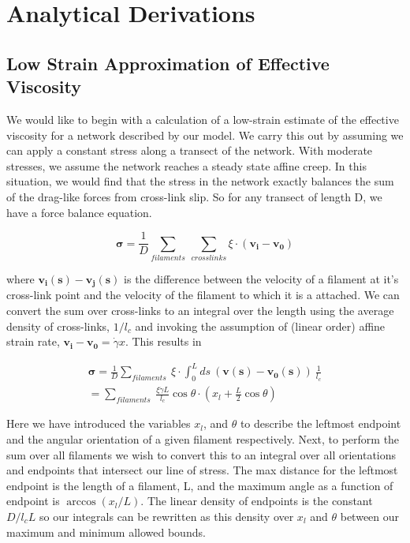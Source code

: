 \documentclass[pre,preprint]{revtex4-1}
\begin{document}
\section{Analytical Derivations}

\subsection{Low Strain Approximation of Effective Viscosity}
We would like to begin with a calculation of a low-strain estimate of the effective viscosity for a network described by our model.  We carry this out by assuming we can apply a constant stress along a transect of the network.  With moderate stresses, we assume the network reaches a steady state affine creep. In this situation, we would find that the stress in the network exactly balances the sum of the drag-like forces from cross-link slip.  So for any transect of length D, we have a force balance equation.

\begin{equation}
\mathbf{\sigma} = \frac{1}{D}\sum_{filaments}\: \sum_{crosslinks}\xi \cdot (\mathbf{v_i}-\mathbf{v_0})
\end{equation}

where $\mathbf{v_i(s)}-\mathbf{v_j(s)}$ is the difference between the velocity of a filament at it's cross-link point and the velocity of the filament to which it is a attached. We can convert the sum over cross-links to an integral over the length using the average density of cross-links, $1/l_c$ and invoking the assumption of (linear order) affine strain rate, $\mathbf{v_i}-\mathbf{v_0}=\dot \gamma x$. This results in

\begin{multline}
\mathbf{\sigma} =  \frac{1}{D}\sum_{filaments}\:  \xi \cdot \int_0^L ds \: (\mathbf{v(s)}-\mathbf{v_0(s)}) \:\frac{1}{l_c} \\
 = \sum_{filaments}\:  \frac{\xi \dot \gamma L}{l_c} \cos \theta \cdot (x_l + \frac{L}{2} \cos \theta)
\end{multline}

Here we have introduced the variables $x_l$, and $\theta$ to describe the leftmost endpoint and the angular orientation of a given filament respectively.  Next, to perform the sum over all filaments we wish to convert this to an integral over all orientations and endpoints that intersect our line of stress. The max distance for the leftmost endpoint is the length of a filament, L, and the maximum angle as a function of endpoint is $\arccos(x_l/L)$.  The linear density of endpoints is the constant $D/l_cL$ so our integrals can be rewritten as this density over $x_l$ and $\theta$ between our maximum and minimum allowed bounds.
\end{document}
